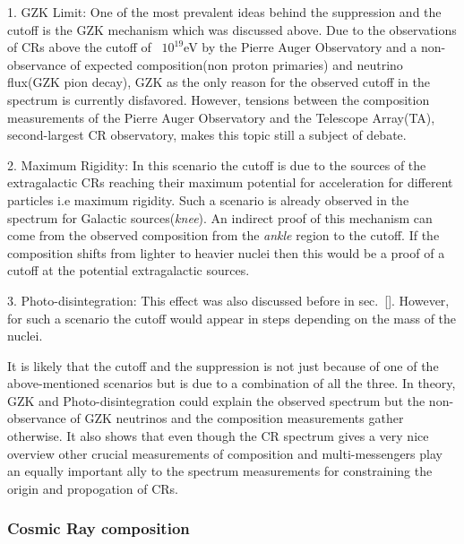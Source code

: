 1. GZK Limit: One of the most prevalent ideas behind the suppression and the cutoff is the GZK mechanism which was discussed above. Due to the observations of CRs above the cutoff of ~$10^{19}$eV by the Pierre Auger Observatory and a non-observance of expected composition(non proton primaries) and neutrino flux(GZK pion decay), GZK as the only reason for the observed cutoff in the spectrum is currently disfavored. However, tensions between the composition measurements of the Pierre Auger Observatory and the Telescope Array(TA), second-largest CR observatory, makes this topic still a subject of debate.

2. Maximum Rigidity: In this scenario the cutoff is due to the sources of the extragalactic CRs reaching their maximum potential for acceleration for different particles i.e maximum rigidity. Such a scenario is already observed in the spectrum for Galactic sources(\textit{knee}). An indirect proof of this mechanism can come from the observed composition from the \textit{ankle} region to the cutoff. If the composition shifts from lighter to heavier nuclei then this would be a proof of a cutoff at the potential extragalactic sources. 

3. Photo-disintegration: This effect was also discussed before in sec.~\ref{}. However, for such a scenario the cutoff would appear in steps depending on the mass of the nuclei. 

It is likely that the cutoff and the suppression is not just because of one of the above-mentioned scenarios but is due to a combination of all the three. In theory, GZK and Photo-disintegration could explain the observed spectrum but the non-observance of GZK neutrinos and the composition measurements gather otherwise. It also shows that even though the CR spectrum gives a very nice overview other crucial measurements of composition and multi-messengers play an equally important ally to the spectrum measurements for constraining the origin and propogation of CRs.

\subsubsection*{Cosmic Ray composition}





